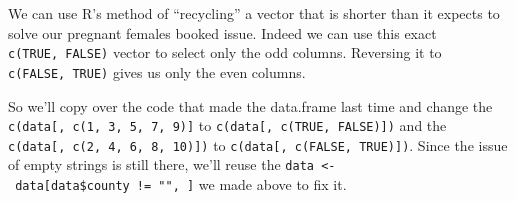 \documentclass[
]{krantz}
\makeatletter
\newenvironment{Shaded}{\begin{snugshade}}{\end{snugshade}}
\newcommand{\AttributeTok}[1]{\textcolor[rgb]{0.61,0.61,0.61}{#1}}
\newcommand{\CommentTok}[1]{\textcolor[rgb]{0.37,0.37,0.37}{\textit{#1}}}
\newcommand{\ConstantTok}[1]{\textcolor[rgb]{0,0,0}{#1}}
\newcommand{\FunctionTok}[1]{\textcolor[rgb]{0,0,0}{#1}}
\newcommand{\NormalTok}[1]{#1}
\newcommand{\OtherTok}[1]{\textcolor[rgb]{0.37,0.37,0.37}{#1}}
\newcommand{\SpecialCharTok}[1]{\textcolor[rgb]{0,0,0}{#1}}
\newcommand{\StringTok}[1]{\textcolor[rgb]{0.5,0.5,0.5}{#1}}
\newenvironment{kframe}{%
\medskip{}
\setlength{\fboxsep}{.8em}
 \def\at@end@of@kframe{}%
 \ifinner\ifhmode%
  \def\at@end@of@kframe{\end{minipage}}%
  \begin{minipage}{\columnwidth}%
 \fi\fi%
 \def\FrameCommand##1{\hskip\@totalleftmargin \hskip-\fboxsep
 \colorbox{shadecolor}{##1}\hskip-\fboxsep
     \hskip-\linewidth \hskip-\@totalleftmargin \hskip\columnwidth}%
 \MakeFramed {\advance\hsize-\width
   \@totalleftmargin\z@ \linewidth\hsize
   \@setminipage}}%
 {\par\unskip\endMakeFramed%
 \at@end@of@kframe}
\renewenvironment{Shaded}{\begin{kframe}}{\end{kframe}}
\makeatother
\begin{document}
We can use R's method of ``recycling'' a vector that is shorter than it expects to solve our pregnant females booked issue. Indeed we can use this exact \texttt{c(TRUE,\ FALSE)} vector to select only the odd columns. Reversing it to \texttt{c(FALSE,\ TRUE)} gives us only the even columns.

So we'll copy over the code that made the data.frame last time and change the \texttt{c(data{[},\ c(1,\ 3,\ 5,\ 7,\ 9){]}} to \texttt{c(data{[},\ c(TRUE,\ FALSE){]})} and the \texttt{c(data{[},\ c(2,\ 4,\ 6,\ 8,\ 10){]})} to \texttt{c(data{[},\ c(FALSE,\ TRUE){]})}. Since the issue of empty strings is still there, we'll reuse the \texttt{data\ \textless{}-\ data{[}data\$county\ !=\ "",\ {]}} we made above to fix it.

\begin{Shaded}
\end{Shaded}
\end{document}
